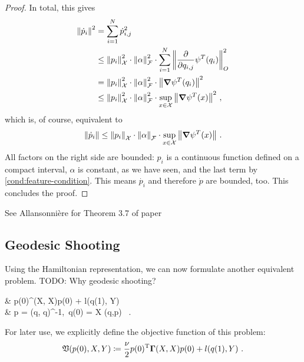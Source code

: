 \begin{proof}
	In total, this gives
	\begin{align}
		\norm{\dot{p}_i}^2 &= \sum_{i=1}^N \dot{p}_{i,j}^2\\
		&\leq \norm{p_i}_{\mathcal{X}}^2 \cdot \norm{\alpha }_{\mathcal{F}}^2 \cdot \sum_{i=1}^N  \norm{\frac{\partial}{\partial q_{i, j}} \psi^T(q_i)}_O^2\\
		& = \norm{p_i}_{\mathcal{X}}^2 \cdot \norm{\alpha }_{\mathcal{F}}^2 \cdot \norm{\grad \psi^T(q_i)}^2 \\
		& \leq \norm{p_i}_{\mathcal{X}}^2 \cdot \norm{\alpha }_{\mathcal{F}}^2 \cdot \sup_{x \in \mathcal{X}}\norm{\grad \psi^T(x)}^2 \ ,
	\end{align}
	which is, of course, equivalent to 
	\begin{equation}
	\label{eq:norm-p-inequality}
		\norm{\dot{p}_i}\leq \norm{p_i}_{\mathcal{X}} \cdot \norm{\alpha }_{\mathcal{F}} \cdot \sup_{x \in \mathcal{X}}\norm{\grad \psi^T(x)} \ .
	\end{equation}
	All factors on the right side are bounded: $p_i$ is a continuous function defined on a compact interval, $\alpha$ is constant, as we have seen, and the last term by \cref{cond:feature-condition}.
	This means $\dot{p_i}$ and therefore $\dot{p}$ are bounded, too.
	This concludes the proof.
\end{proof}

See Allansonnière for Theorem 3.7 of paper

\subsection{Geodesic Shooting}

Using the Hamiltonian representation, we can now formulate another equivalent problem.
TODO: Why geodesic shooting?

\begin{problem}
	\label{prob:geodesic-shooting}
	\begin{cases}
		&  p(0)^\T \bGamma(X, X)p(0) + l(q(1), Y)\\
		 & p = \bGamma(q, q)^{-1},\ q(0) = X  (q,p)  \ .
	\end{cases}
\end{problem}

For later use, we explicitly define the objective function of this problem:
\begin{equation}
	\label{eq:geodesic-shooting-objective}
	\mathfrak{V}(p(0), X, Y) \coloneqq \frac{\nu}{2} p(0)^{\mathrm{T}} \mathbf{\Gamma}(X, X)p(0) + l(q(1), Y) \ .
\end{equation}

